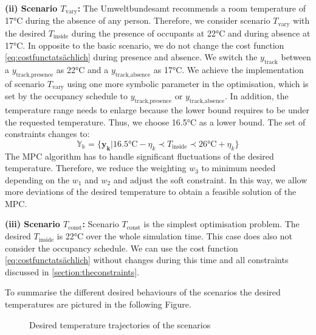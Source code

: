 \textbf{(ii) Scenario $T_\text{vary}$:}\newline
The Umweltbundesamt \cite{Umweltbundesamt.7.10.2021} recommends a room temperature of 17°C during the absence of any person. Therefore, we consider scenario $T_\text{vary}$ with the desired $T_\text{inside}$ during the presence of occupants at 22°C and during absence at 17°C. In opposite to the basic scenario, we do not change the cost function \ref{eq:costfunctatsächlich} during presence and absence. We switch the $y_\text{track}$ between a $y_\text{track,presence}$ as 22°C and a $y_\text{track,absence}$ as 17°C. We achieve the implementation of scenario $T_\text{vary}$ using one more symbolic parameter in the optimisation, which is set by the occupancy schedule to $y_\text{track,presence}$ or $y_\text{track,absence}$. In addition, the temperature range needs to enlarge because the lower bound requires to be under the requested temperature. Thus, we choose 16.5°C as a lower bound. The set of constraints changes to:
\begin{equation}
    \label{ConstraintYScenario2}
    \mathbb{Y_k} = \{\mathbf{y_k}| 16.5 \text{°C} - \eta_k \prec T_\text{inside} \prec 26 \text{°C}+ \eta_k\} 
\end{equation}
The MPC algorithm has to handle significant fluctuations of the desired temperature. Therefore, we reduce the weighting $w_\text{3}$ to minimum needed depending on the $w_\text{1}$ and $w_\text{2}$ and adjust the soft constraint. In this way, we allow more deviations of the desired temperature to obtain a feasible solution of the MPC. \newline 

\textbf{(iii) Scenario $T_\text{const}$:}\newline
Scenario $T_\text{const}$ is the simplest optimisation problem. The desired $T_\text{inside}$ is 22°C over the whole simulation time. This case does also not consider the occupancy schedule. We can use the cost function \ref{eq:costfunctatsächlich} without changes during this time and all constraints discussed in \autoref{section:theconstraints}.\newline

To summarise the different desired behaviours of the scenarios the desired temperatures are pictured in the following Figure.
    \begin{figure}[H]
           \centering
        \def\svgwidth{1.1\textwidth}
        
        \caption{Desired temperature trajectories of the scenarios}
         \label{fig:Solltemperaturverlauf}
    \end{figure}

